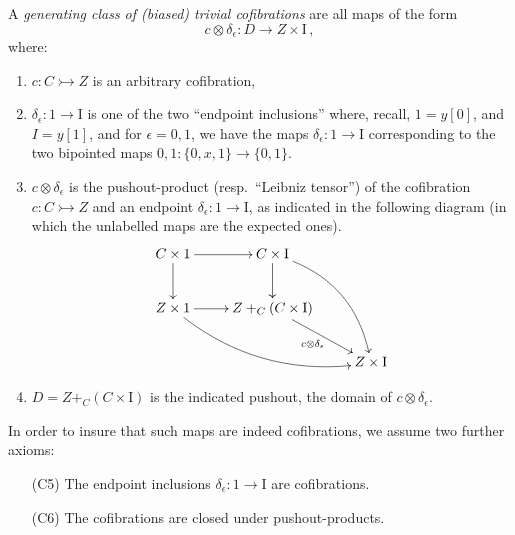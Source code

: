 \documentclass[11pt]{article}
\newcommand{\mono}{\ensuremath{\rightarrowtail}}
\newcommand{\I}{\ensuremath{\mathrm{I}}}
\theoremstyle{remark}
\theoremstyle{definition}
\begin{document}
A \emph{generating class of (biased) trivial cofibrations} are all maps of the form
\begin{equation}\label{eq:genclasstrivcof}
c \otimes \delta_\epsilon : D \to Z\times \I\,,
\end{equation}
where:
\begin{enumerate}
\item  $c : C \mono Z$ is an arbitrary cofibration,

\item $\delta_\epsilon : 1 \to \I$ is one of the two ``endpoint inclusions'' where, recall, $1 = y[0]$, and $I=y[1]$, and for $\epsilon = 0,1$, we have the maps $\delta_\epsilon : 1 \to \I$ corresponding to the two bipointed maps $0,1 : \{0, x, 1\} \to \{0,1\}$.

\item $c\otimes\delta_\epsilon$ is the pushout-product (resp.\ ``Leibniz tensor'') of the cofibration $c : C\mono Z$ and an endpoint $\delta_\epsilon:1 \to \I$, as indicated in the following diagram (in which the unlabelled maps are the expected ones).
\begin{equation}\label{diagram:pushoutproduct}
\xymatrix{
C\times 1 \ar[d] \ar[r] & C\times \I \ar[d] \ar@/^4ex/ [rdd]\\
Z\times 1 \ar@/_4ex/ [rrd] \ar[r] &  Z +_C (C\times\I) \ar[rd]_{c \otimes \delta_\epsilon} \\
&& Z\times\I
}
\end{equation}

\item $D = Z +_C (C\times\I)$ is the indicated pushout, the domain of $c \otimes \delta_\epsilon$.
\end{enumerate}

In order to insure that such maps are indeed cofibrations, we assume  two further axioms:
\begin{enumerate}
\item[(C5)] The endpoint inclusions $\delta_\epsilon : 1 \to \I$ are cofibrations.
\item[(C6)] The cofibrations are closed under pushout-products.  
\end{enumerate}
\end{document}
